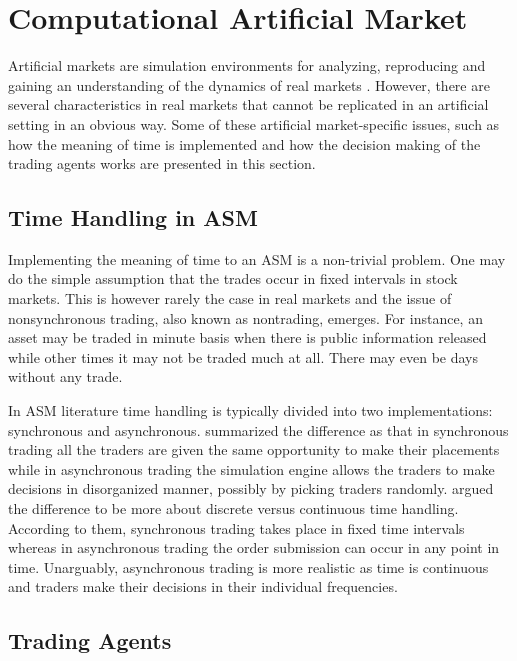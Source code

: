 \section{Computational Artificial Market}
Artificial markets are simulation environments for analyzing, 
reproducing and gaining an understanding of the dynamics of 
real markets \citep{Julien07}. However, there are several 
characteristics in real markets that cannot be replicated
in an artificial setting in an obvious way. Some of these artificial
market-specific issues, such as how the meaning of time is 
implemented and how the decision making of the trading agents
works are presented in this section.


\subsection{Time Handling in ASM}

Implementing the meaning of time to an ASM is a non-trivial problem.
One may do the simple assumption that the trades occur in fixed
intervals in stock markets. This is however rarely the case in real markets
and the issue of nonsynchronous trading, also known as nontrading, emerges. 
For instance, an asset may be traded in minute basis when there is
public information released while other times it may not be traded much at all.
There may even be days without any trade. \citep{Econometrics} 

In ASM literature time handling is typically divided into two implementations:
synchronous and asynchronous. \citet{Julien07} summarized the difference as that in synchronous
trading all the traders are given the same opportunity to make their placements
while in asynchronous trading the simulation engine allows the traders to 
make decisions in disorganized manner, possibly by picking traders randomly.
\citet{Ben17} argued the difference to be more about discrete versus continuous time handling.
According to them, synchronous trading takes place in fixed time intervals whereas in 
asynchronous trading the order submission can occur in any point in time. Unarguably, 
asynchronous trading is more realistic as time is continuous and traders make
their decisions in their individual frequencies.


\subsection{Trading Agents}
\label{section:ASMTradingAgents}

